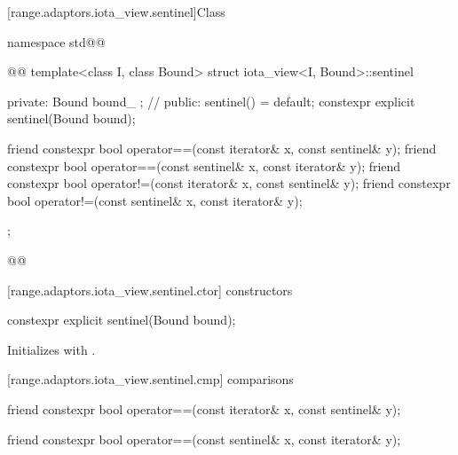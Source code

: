 \begin{itemdescr}
\pnum
\oldtxt{\returns} 
\end{itemdescr}

[range.adaptors.iota_view.sentinel]{Class }

\begin{codeblock}
namespace std@@ { @@
  template<class I, class Bound>
  struct iota_view<I, Bound>::sentinel {
  private:
    Bound bound_ {}; // \expos
  public:
    sentinel() = default;
    constexpr explicit sentinel(Bound bound);

    friend constexpr bool operator==(const iterator& x, const sentinel& y);
    friend constexpr bool operator==(const sentinel& x, const iterator& y);
    friend constexpr bool operator!=(const iterator& x, const sentinel& y);
    friend constexpr bool operator!=(const sentinel& x, const iterator& y);
  };
}@\oldtxt{\}}@
\end{codeblock}

[range.adaptors.iota_view.sentinel.ctor]{ constructors}

\begin{itemdecl}
constexpr explicit sentinel(Bound bound);
\end{itemdecl}

\begin{itemdescr}
\pnum
\effects Initializes  with .
\end{itemdescr}

[range.adaptors.iota_view.sentinel.cmp]{ comparisons}

\begin{itemdecl}
friend constexpr bool operator==(const iterator& x, const sentinel& y);
\end{itemdecl}

\begin{itemdescr}
\pnum
\oldtxt{\returns} 
\end{itemdescr}

\begin{itemdecl}
friend constexpr bool operator==(const sentinel& x, const iterator& y);
\end{itemdecl}

